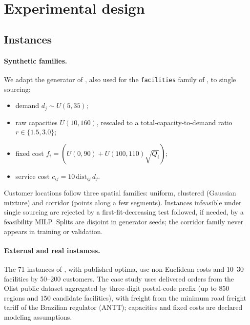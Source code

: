 \section{Experimental design}\label{sec:experiments}

\subsection{Instances}\label{sec:data}
\paragraph{Synthetic families.} We adapt the generator of \citet{cornuejols1991}, also used for
the \texttt{facilities} family of \citet{gasse2019}, to single sourcing:
\begin{itemize}
\item demand $d_j\sim U(5,35)$;
\item raw capacities $U(10,160)$, rescaled to a total-capacity-to-demand ratio
$r\in\{1.5, 3.0\}$;
\item fixed cost $f_i = (U(0,90) + U(100,110)\sqrt{Q_i})$;
\item service cost $c_{ij} = 10\, \mathrm{dist}_{ij}\, d_j$.
\end{itemize}
Customer locations follow three spatial families: uniform, clustered (Gaussian mixture) and
corridor (points along a few segments). Instances infeasible under single sourcing are rejected
by a first-fit-decreasing test followed, if needed, by a feasibility MILP. Splits are disjoint in
generator seeds; the corridor family never appears in training or validation.

\paragraph{External and real instances.} The 71 instances of \citet{holmberg1999}, with
published optima, use non-Euclidean costs and 10--30 facilities by 50--200 customers. The case
study uses delivered orders from the Olist public dataset aggregated by three-digit postal-code
prefix (up to 850 regions and 150 candidate facilities), with freight from the minimum road
freight tariff of the Brazilian regulator (ANTT); capacities and fixed costs are declared
modeling assumptions.

